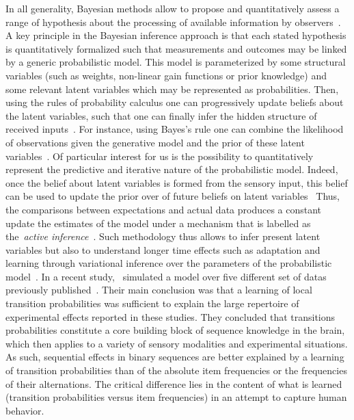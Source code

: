 \documentclass[profile,final,english, draft]{article}%
\newcommand{\citep}[1]{\parencite{#1}}
\newcommand{\citet}[1]{\textcite{#1}}
\begin{document}
In all generality, Bayesian methods allow to propose and quantitatively assess
a range of hypothesis about the processing
of available information by observers~\citep{Deneve1999, Diaconescu2014, Deaunizau}.
A key principle in the Bayesian inference approach is
that each stated hypothesis is quantitatively formalized
such that measurements and outcomes may be linked by
a generic probabilistic model. %
This model is parameterized by some structural variables
(such as weights, non-linear gain functions or prior knowledge)
and some relevant latent variables
which may be represented as probabilities.
Then, using the rules of probability calculus
one can progressively update beliefs about the latent variables,
such that one can finally infer the hidden structure of received inputs~\citep{Hoyer2003, Ma2014}.
For instance, using Bayes's rule one can combine
the likelihood of observations given the generative model and
the prior of these latent variables~\citep{Janes2014}.
Of particular interest for us is the possibility to
quantitatively represent
the predictive and iterative nature of the probabilistic model.
Indeed, once the belief about latent variables
is formed from the sensory input,
this belief can be used to update
the prior over of future beliefs on latent variables~\citep{Montagnini2007}
Thus, the comparisons between expectations and actual data produces
a constant update the estimates of the model under a mechanism
that is labelled as the~\textit{active inference}~\citep{Friston2003, Friston2010}.
Such methodology thus allows to infer present latent variables
but also to understand longer time effects such as adaptation and learning
through variational inference over
the parameters of the probabilistic model~\citep{ref}.
In a recent study,~\citet{Meyniel2016} simulated
a model over five different set of datas
previously published~\citep{Squires1976, Huettel2002, Kolossa2013, Cho2002, Falk1997}.
Their main conclusion was that
a learning of local transition probabilities
was sufficient to explain the large repertoire
of experimental effects reported in these studies.
They concluded that transitions probabilities constitute
a core building block of sequence knowledge in the brain,
which then applies to a variety of sensory modalities and
experimental situations.
As such, sequential effects in binary sequences are better explained
by a learning of transition probabilities
than of the absolute item frequencies or the frequencies of their alternations.
The critical difference lies in the content
of what is learned (transition probabilities versus item frequencies)
in an attempt to capture human behavior.
\end{document}
